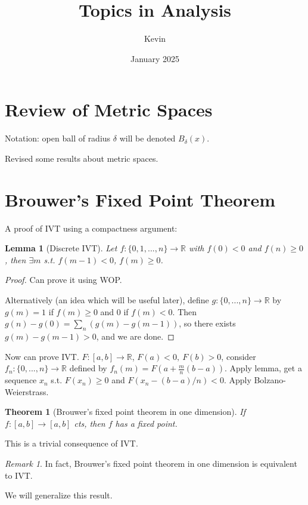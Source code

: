 \documentclass{article}
\title{Topics in Analysis}
\author{Kevin}
\date{January 2025}
\theoremstyle{definition}
\theoremstyle{remark}
\newtheorem{rem}{Remark}
\theoremstyle{plain}
\newtheorem{lem}[defn]{Lemma}
\newtheorem{thm}[defn]{Theorem}
\newcommand{\RR}{\mathbb{R}}
\begin{document}
\maketitle
\section*{Review of Metric Spaces}
Notation: open ball of radius $\delta$ will be denoted $B_\delta(x)$.

Revised some results about metric spaces.

\section{Brouwer's Fixed Point Theorem}
A proof of IVT using a compactness argument:
\begin{lem}[Discrete IVT]
    Let $f:\{0,1,...,n\}\to\RR$ with $f(0)<0$ and $f(n)\ge 0$, then $\exists m$ s.t. $f(m-1)<0$, $f(m)\ge 0$.
\end{lem}
\begin{proof}
    Can prove it using WOP.

    Alternatively (an idea which will be useful later), define $g:\{0,...,n\}\to\RR$ by $g(m)=1$ if $f(m)\ge 0$ and $0$ if $f(m)<0$. Then $g(n)-g(0)=\sum_n(g(m)-g(m-1))$, so there exists $g(m)-g(m-1)>0$, and we are done. 
\end{proof}
Now can prove IVT. $F:[a,b]\to\RR$, $F(a)<0,\ F(b)>0$, consider $f_n:\{0,...,n\}\to\RR$ defined by $f_n(m)=F(a+\frac{m}{n}(b-a))$. Apply lemma, get a sequence $x_n$ s.t. $F(x_n)\ge 0$ and $F(x_n-(b-a)/n)<0$. Apply Bolzano-Weierstrass.

\begin{thm}[Brouwer's fixed point theorem in one dimension]
    If $f:[a,b]\to[a,b]$ cts, then $f$ has a fixed point.
\end{thm}
This is a trivial consequence of IVT.

\begin{rem}
    In fact, Brouwer's fixed point theorem in one dimension is equivalent to IVT.
\end{rem}

We will generalize this result.
\end{document}
